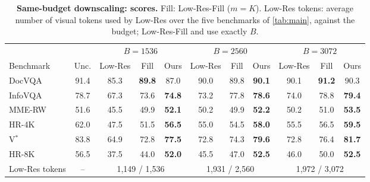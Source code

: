 \begin{table}[t]
  \centering
  \footnotesize
  \setlength{\tabcolsep}{4pt}
  \begin{tabular}{l c ccc ccc ccc}
    \toprule
    & & \multicolumn{3}{c}{$B=1536$} & \multicolumn{3}{c}{$B=2560$} & \multicolumn{3}{c}{$B=3072$} \\
    \cmidrule(lr){3-5}\cmidrule(lr){6-8}\cmidrule(lr){9-11}
    Benchmark & Unc. & Low-Res & Fill & Ours & Low-Res & Fill & Ours & Low-Res & Fill & Ours \\
    \midrule
    DocVQA & 91.4 & 85.3 & \textbf{89.8} & 87.0 & 90.0 & 89.8 & \textbf{90.1} & 90.1 & \textbf{91.2} & 90.3 \\
    InfoVQA & 78.7 & 67.3 & 73.6 & \textbf{74.8} & 73.2 & 77.8 & \textbf{78.6} & 74.0 & 78.8 & \textbf{79.4} \\
    MME-RW & 51.6 & 45.5 & 49.9 & \textbf{52.1} & 50.2 & 49.9 & \textbf{52.2} & 50.2 & 51.0 & \textbf{53.5} \\
    HR-4K & 62.0 & 47.5 & 51.5 & \textbf{56.5} & 55.0 & 54.5 & \textbf{58.0} & 55.5 & 56.5 & \textbf{59.5} \\
    V$^*$ & 83.8 & 64.9 & 72.8 & \textbf{77.5} & 72.8 & 74.3 & \textbf{79.6} & 72.8 & 76.4 & \textbf{81.7} \\
    HR-8K & 56.5 & 37.5 & 44.0 & \textbf{52.0} & 45.5 & 47.0 & \textbf{52.5} & 46.0 & 50.0 & \textbf{52.5} \\
    \midrule
    Low-Res tokens & -- & \multicolumn{3}{c}{1{,}149 / 1{,}536} & \multicolumn{3}{c}{1{,}931 / 2{,}560} & \multicolumn{3}{c}{1{,}972 / 3{,}072} \\
    \bottomrule
  \end{tabular}
  \caption{\textbf{Same-budget downscaling: scores.} Fill: Low-Res-Fill ($m{=}K$). Low-Res tokens: average number of visual tokens used by Low-Res over the five benchmarks of \cref{tab:main}, against the budget; Low-Res-Fill and \method use exactly $B$.}
  \label{tab:downscale_full}
\end{table}

